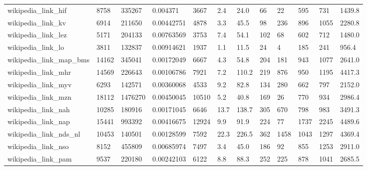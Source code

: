 \begin{longtable}{llllllllllll}
 wikipedia\_link\_hif                                 & 8758       & 335267    & 0.004371    & 3667  & 2.4    & 24.0   & 66    & 22     & 595    & 731    & 1439.8  \\
 wikipedia\_link\_kv                                  & 6914       & 211650    & 0.00442751  & 4878  & 3.3    & 45.5   & 98    & 236    & 896    & 1055   & 2280.8  \\
 wikipedia\_link\_lez                                 & 5171       & 204133    & 0.00763569  & 3753  & 7.4    & 54.1   & 102   & 68     & 602    & 712    & 1480.0  \\
 wikipedia\_link\_lo                                  & 3811       & 132837    & 0.00914621  & 1937  & 1.1    & 11.5   & 24    & 4      & 185    & 241    & 956.4   \\
 wikipedia\_link\_map\_bms                             & 14162      & 345041    & 0.00172049  & 6667  & 4.3    & 54.8   & 204   & 181    & 943    & 1077   & 2641.0  \\
 wikipedia\_link\_mhr                                 & 14569      & 226643    & 0.00106786  & 7921  & 7.2    & 110.2  & 219   & 876    & 950    & 1195   & 4417.3  \\
 wikipedia\_link\_myv                                 & 6293       & 142571    & 0.00360068  & 4533  & 9.2    & 82.8   & 134   & 280    & 662    & 797    & 2152.0  \\
 wikipedia\_link\_mzn                                 & 18112      & 1476270   & 0.00450045  & 10510 & 5.2    & 40.8   & 169   & 26     & 770    & 934    & 2986.4  \\
 wikipedia\_link\_nah                                 & 10285      & 180916    & 0.00171045  & 6646  & 13.7   & 138.7  & 305   & 670    & 798    & 983    & 3491.3  \\
 wikipedia\_link\_nap                                 & 15441      & 993392    & 0.00416675  & 12924 & 9.9    & 91.9   & 224   & 77     & 1737   & 2245   & 4489.6  \\
 wikipedia\_link\_nds\_nl                              & 10453      & 140501    & 0.00128599  & 7592  & 22.3   & 226.5  & 362   & 1458   & 1043   & 1297   & 4369.4  \\
 wikipedia\_link\_nso                                 & 8152       & 455809    & 0.00685974  & 7497  & 3.4    & 45.0   & 186   & 92     & 855    & 1253   & 2911.0  \\
 wikipedia\_link\_pam                                 & 9537       & 220180    & 0.00242103  & 6122  & 8.8    & 88.3   & 252   & 225    & 878    & 1041   & 2685.5  \\

\end{longtable}
